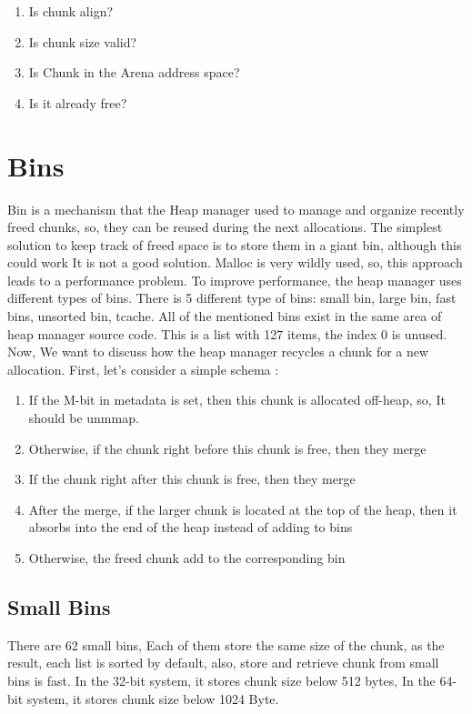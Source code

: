 \documentclass{masterthesis}
\newcommand*\fb{fast bins}
\begin{document}
\begin{enumerate}
	\item Is chunk align? 
	\item Is chunk size valid?
	\item Is Chunk in the Arena address space?
	\item Is it already free?
\end{enumerate}

\section{Bins}
	Bin is a mechanism that the Heap manager used to manage and organize recently freed chunks, so, they can be reused during the next allocations. The simplest solution to keep track of freed space is to store them in a giant bin, although this could work It is not a good solution. Malloc is very wildly used, so, this approach leads to a performance problem.
To improve performance, the heap manager uses different types of bins. There is 5 different type of bins: small bin, large bin, \fb{}, unsorted bin, tcache. All of the mentioned bins exist in the same area of heap manager source code. This is a list with 127 items, the index 0 is unused. 
Now, We want to discuss how the heap manager recycles a chunk for a new allocation. First, let's consider a simple schema :
\begin{enumerate}
	\item If the M-bit in metadata is set, then this chunk is allocated off-heap, so, It should be unmmap.
	\item Otherwise, if the chunk right before this chunk is free, then they merge
	\item If the chunk right after this chunk is free, then they merge
	\item After the merge, if the larger chunk is located at the top of the heap, then it absorbs into the end of the heap instead of adding to bins
	\item Otherwise, the freed chunk add to the corresponding bin
\end{enumerate}

\subsection{Small Bins}
There are 62 small bins, Each of them store the same size of the chunk, as the result, each list is sorted by default, also, store and retrieve chunk from small bins is fast. In the 32-bit system, it stores chunk size below 512 bytes, In the 64-bit system, it stores chunk size below 1024 Byte. 
\end{document}
